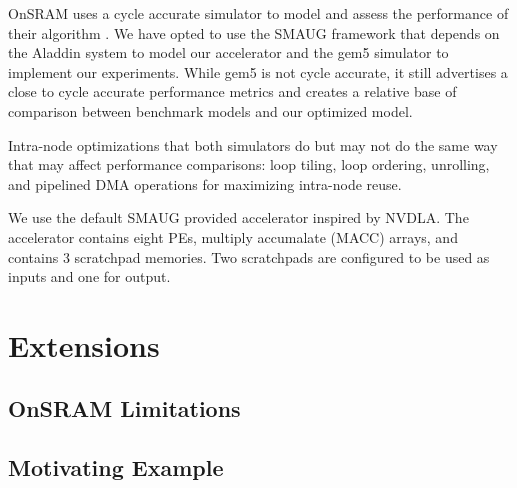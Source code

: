 OnSRAM uses a cycle accurate simulator to model and assess the performance of
their algorithm \cite{onsram}.  We have opted to use the SMAUG\cite{smaug}
framework that depends on the Aladdin\cite{aladdin} system to model our
accelerator and the gem5 simulator\cite{gem5} to implement our experiments.
While gem5 is not cycle accurate, it still advertises a close to cycle accurate
performance metrics and creates a relative base of comparison between benchmark
models and our optimized model.

Intra-node optimizations that both simulators do but may not do the same way
that may affect performance comparisons: loop tiling, loop ordering, unrolling,
and pipelined DMA operations for maximizing intra-node reuse.

We use the default SMAUG provided accelerator inspired by NVDLA\cite{smaug}.
The accelerator contains eight PEs, multiply accumalate (MACC) arrays, and
contains 3 scratchpad memories\cite{smaug}. Two scratchpads are configured to
be used as inputs and one for output.



\section{Extensions}


\subsection{OnSRAM Limitations}


\subsection{Motivating Example}
